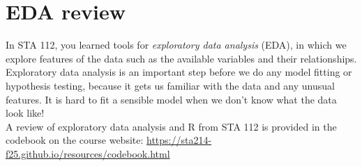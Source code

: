 \documentclass[11pt]{article}
\begin{document}
\section{EDA review}

In STA 112, you learned tools for \textit{exploratory data analysis} (EDA), in which we explore features of the data such as the available variables and their relationships. Exploratory data analysis is an important step before we do any model fitting or hypothesis testing, because it gets us familiar with the data and any unusual features. It is hard to fit a sensible model when we don't know what the data look like!\\

\noindent A review of exploratory data analysis and R from STA 112 is provided in the codebook on the course website: \url{https://sta214-f25.github.io/resources/codebook.html} 
\end{document}

